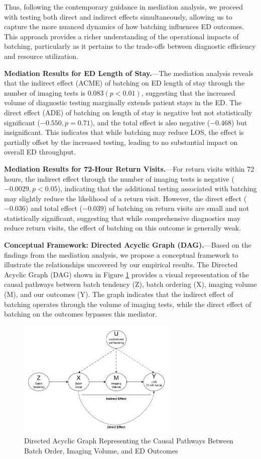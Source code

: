 \documentclass{article}
\begin{document}
Thus, following the contemporary guidance in mediation analysis, we
proceed with testing both direct and indirect effects simultaneously,
allowing us to capture the more nuanced dynamics of how batching
influences ED outcomes. This approach provides a richer understanding of
the operational impacts of batching, particularly as it pertains to the
trade-offs between diagnostic efficiency and resource utilization.

\textbf{Mediation Results for ED Length of Stay.}---The mediation
analysis reveals that the indirect effect (ACME) of batching on ED
length of stay through the number of imaging tests is
\(0.083 (p < 0.01)\), suggesting that the increased volume of diagnostic
testing marginally extends patient stays in the ED. The direct effect
(ADE) of batching on length of stay is negative but not statistically
significant (\(-0.550, p = 0.71\)), and the total effect is also
negative (\(-0.468\)) but insignificant. This indicates that while
batching may reduce LOS, the effect is partially offset by the increased
testing, leading to no substantial impact on overall ED throughput.

\textbf{Mediation Results for 72-Hour Return Visits.}---For return
visits within 72 hours, the indirect effect through the number of
imaging tests is negative (\(-0.0029, p < 0.05\)), indicating that the
additional testing associated with batching may slightly reduce the
likelihood of a return visit. However, the direct effect (\(-0.036\))
and total effect (\(-0.039\)) of batching on return visits are small and
not statistically significant, suggesting that while comprehensive
diagnostics may reduce return visits, the effect of batching on this
outcome is generally weak.

\textbf{Conceptual Framework: Directed Acyclic Graph (DAG).}---Based on
the findings from the mediation analysis, we propose a conceptual
framework to illustrate the relationships uncovered by our empirical
results. The Directed Acyclic Graph (DAG) shown in Figure \ref{fig:dag}
provides a visual representation of the causal pathways between batch
tendency (Z), batch ordering (X), imaging volume (M), and our outcomes
(Y). The graph indicates that the indirect effect of batching operates
through the volume of imaging tests, while the direct effect of batching
on the outcomes bypasses this mediator.

\begin{figure}[h]
\centering
\includegraphics[width=3in]{model.png}
\caption{Directed Acyclic Graph Representing the Causal Pathways Between Batch Order, Imaging Volume, and ED Outcomes}
\label{fig:dag}
\end{figure}
\end{document}
